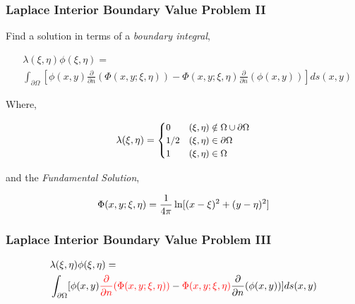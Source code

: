 \begin{frame}
    \frametitle{Laplace Interior Boundary Value Problem II}

    Find a solution in terms of a \textit{boundary integral},

    \begin{equation}
        \begin{aligned}
        & \lambda(\xi, \eta)\phi(\xi, \eta) = \\
        &  \int_{\partial \Omega} [\phi(x, y) \frac{\partial}{\partial n}(\Phi(x, y; \xi, \eta)) - \Phi(x, y; \xi, \eta)\frac{\partial}{\partial n}(\phi(x, y))] ds(x, y)
        \end{aligned}
    \end{equation}

    Where,

  \begin{equation}
    \small
     \lambda(\xi, \eta) =
        \begin{cases}
          0 & (\xi, \eta) \notin \Omega \cup \partial \Omega\\
          1/2 & (\xi, \eta) \in \partial \Omega \\
          1 & (\xi, \eta) \in \Omega
        \end{cases}
    \end{equation}

  \hspace*{5pt}

  and the \textit{Fundamental Solution},

  \begin{equation}
    \small
    \Phi(x,y; \xi, \eta) = \frac{1}{4\pi} \ln [(x-\xi)^2 + (y-\eta)^2]
  \end{equation}

\end{frame}

\begin{frame}
    \frametitle{Laplace Interior Boundary Value Problem III}
    \begin{equation}
        \begin{aligned}
            & \lambda(\xi, \eta)\phi(\xi, \eta) = \\
            & \int_{\partial \Omega} [\phi(x, y) \color{red} \frac{\partial}{\partial n}(\Phi(x, y; \xi, \eta))  \color{black} - \color{red} \Phi(x, y; \xi, \eta) \color{black}\frac{\partial}{\partial n}(\phi(x, y))] ds(x, y)
        \end{aligned}
    \end{equation}
\end{frame}



